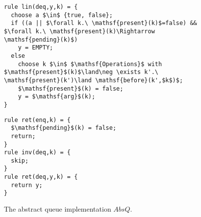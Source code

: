 \begin{figure}[t]
\begin{minipage}[t]{7.5cm}
\begin{lstlisting}
rule lin(deq,y,k) = {
  choose a $\in$ {true, false};
  if ((a || $\forall k.\ \mathsf{present}(k)$=false) && $\forall k.\ \mathsf{present}(k)\Rightarrow \mathsf{pending}(k)$) 
    y = EMPTY;
  else 
    choose k $\in$ $\mathsf{Operations}$ with $\mathsf{present}$(k)$\land\neg \exists k'.\ \mathsf{present}(k')\land \mathsf{before}(k',$k$)$;
    $\mathsf{present}$(k) = false;
    y = $\mathsf{arg}$(k);
}
\end{lstlisting}
\end{minipage}
\begin{minipage}[t]{5cm}
\vspace{-1mm}
\begin{lstlisting}
rule ret(enq,k) = {
  $\mathsf{pending}$(k) = false;
  return;
}
rule inv(deq,k) = {
  skip;
}
rule ret(deq,y,k) = {
  return y;
}
\end{lstlisting}
\end{minipage}
	\caption{The abstract queue implementation $AbsQ$.}
	\label{fig:signatures}
\end{figure}




